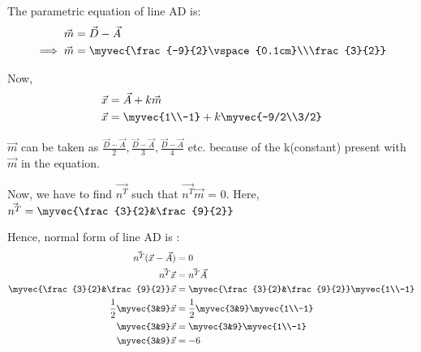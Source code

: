\documentclass[journal,12pt,twocolumn]{IEEEtran}
\theoremstyle{remark}
\begin{document}
The parametric equation of line AD is:
\begin{align}
\vec{m} &= \vec{D} - \vec{A}\\
\implies\vec{m} &= \myvec{\frac{-9}{2}\vspace{0.1cm}\\\frac{3}{2}}
\end{align}

Now,
\begin{align}
\vec{x} &= \vec{A} + k\vec{m}\\
\vec{x} &= \myvec{1\\-1} + k\myvec{-9/2\\3/2}
\end{align}
\newline

$\vec{m}$ can be taken as $\frac{\vec{D} - \vec{A}}{2}, \frac{\vec{D} - \vec{A}}{3}, \frac{\vec{D} - \vec{A}}{4}$ etc. because of the k(constant) present with $\vec{m}$ in the equation.
\newline
\newline

Now, we have to find $\vec{n^T}$ such that $\vec{n^T}\vec{m}$ = 0.\newline
\newline
Here, $\vec{n^T} = \myvec{\frac{3}{2}&\frac{9}{2}}$
\newline


Hence, normal form of line AD is :
\begin{align}
\vec{n^T}(\vec{x} - \vec{A}) &= 0\\
\vec{n^T}\vec{x} &= \vec{n^T}\vec{A}\\
\myvec{\frac{3}{2}&\frac{9}{2}}\vec{x} &= \myvec{\frac{3}{2}&\frac{9}{2}}\myvec{1\\-1}\\
\frac{1}{2}\myvec{3&9}\vec{x} &= \frac{1}{2}\myvec{3&9}\myvec{1\\-1}\\
\myvec{3&9}\vec{x} &= \myvec{3&9}\myvec{1\\-1}\\
\myvec{3&9}\vec{x} &= -6
\end{align}
\end{document}
